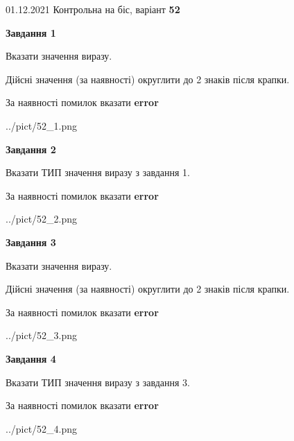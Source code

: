 \documentclass[11pt, ukrainian]{article}
\begin{document}
{01.12.2021 Контрольна на біс, варіант  \No \textbf { 52 }\par}
{
\begin {large}
{\begin {center}\textbf{Завдання 1}\end {center}}\par
Вказати значення виразу. \par
Дійсні значення (за наявності) округлити до 2 знаків після крапки. \par
За наявності помилок вказати \textbf{error}

\begin{center}
	{../pict/52_1.png}
\end{center}
\newpage

{\begin {center}\textbf{Завдання 2}\end {center}}\par
Вказати ТИП значення виразу з завдання 1. \par
За наявності помилок вказати \textbf{error}

\begin{center}
	{../pict/52_2.png}
\end{center}
\newpage

{\begin {center}\textbf{Завдання 3}\end {center}}\par
Вказати значення виразу. \par
Дійсні значення (за наявності) округлити до 2 знаків після крапки. \par
За наявності помилок вказати \textbf{error}

\begin{center}
	{../pict/52_3.png}
\end{center}
\newpage

{\begin {center}\textbf{Завдання 4}\end {center}}\par
Вказати ТИП значення виразу з завдання 3. \par
За наявності помилок вказати \textbf{error}

\begin{center}
	{../pict/52_4.png}
\end{center}
\newpage


\end{large}}
\end{document}
